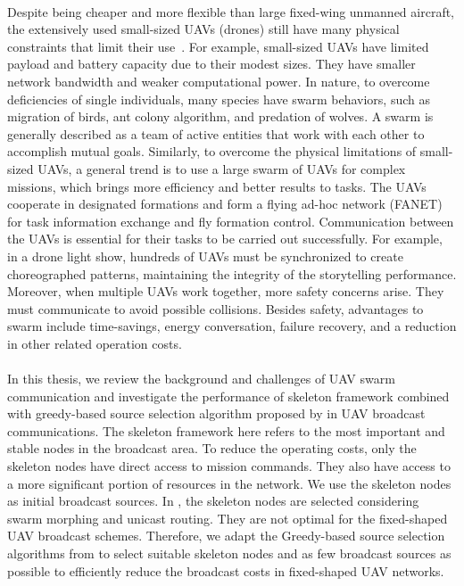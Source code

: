 \documentclass[a4paper,12pt]{report}
\begin{document}
\paragraph{}
Despite being cheaper and more flexible than large fixed-wing unmanned aircraft, the extensively used small-sized UAVs (drones) still have many physical constraints that limit their use~\cite{4}. For example, small-sized UAVs have limited payload and battery capacity due to their modest sizes. They have smaller network bandwidth and weaker computational power. In nature, to overcome deficiencies of single individuals, many species have swarm behaviors, such as migration of birds, ant colony algorithm, and predation of wolves\cite{swarm,doi:10.1139/juvs-2018-0009}. A swarm is generally described as a team of active entities that work with each other to accomplish mutual goals\cite{doi:10.1139/juvs-2018-0009}. Similarly, to overcome the physical limitations of small-sized UAVs, a general trend is to use a large swarm of UAVs for complex missions, which brings more efficiency and better results to tasks. The UAVs cooperate in designated formations and form a flying ad-hoc network (FANET) for task information exchange and fly formation control\cite{4,5,6}.  Communication between the UAVs is essential for their tasks to be carried out successfully. For example, in a drone light show, hundreds of UAVs must be synchronized to create choreographed patterns, maintaining the integrity of the storytelling performance. Moreover, when multiple UAVs work together, more safety concerns arise. They must communicate to avoid possible collisions. Besides safety, advantages to swarm include time-savings, energy conversation, failure recovery, and a reduction in other related operation costs\cite{doi:10.1139/juvs-2018-0009}.

\paragraph{}
In this thesis, we review the background and challenges of UAV swarm communication and investigate the performance of skeleton framework\cite{ssr} combined with greedy-based source selection algorithm proposed by \cite{prose} in UAV broadcast communications. The skeleton framework here refers to the most important and stable nodes in the broadcast area. To reduce the operating costs, only the skeleton nodes have direct access to mission commands. They also have access to a more significant portion of resources in the network\cite{ssr}. We use the skeleton nodes as initial broadcast sources. In \cite{ssr}, the skeleton nodes are selected considering swarm morphing and unicast routing. They are not optimal for the fixed-shaped UAV broadcast schemes. Therefore, we adapt the Greedy-based source selection algorithms from \cite{prose} to select suitable skeleton nodes and as few broadcast sources as possible to efficiently reduce the broadcast costs in fixed-shaped UAV networks.
\end{document}
